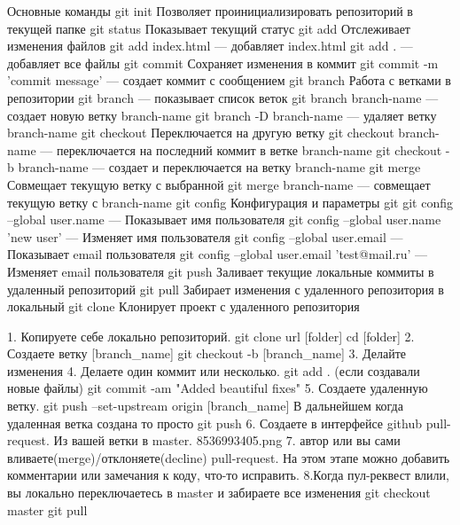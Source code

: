 
Основные команды
git init
Позволяет проинициализировать репозиторий в текущей папке
git status
Показывает текущий статус
git add
Отслеживает изменения файлов
git add index.html — добавляет index.html
git add . — добавляет все файлы
git commit
Сохраняет изменения в коммит
git commit -m 'commit message' — создает коммит с сообщением
git branch
Работа с ветками в репозитории
git branch — показывает список веток
git branch branch-name — создает новую ветку branch-name
git branch -D branch-name — удаляет ветку branch-name
git checkout
Переключается на другую ветку
git checkout branch-name — переключается на последний коммит в ветке
branch-name
git checkout -b branch-name — создает и переключается на ветку branch-name
git merge
Совмещает текущую ветку с выбранной
git merge branch-name — совмещает текущую ветку с branch-name
git config
Конфигурация и параметры git
git config --global user.name — Показывает имя пользователя
git config --global user.name 'new user' — Изменяет имя пользователя
git config --global user.email — Показывает email пользователя
git config --global user.email 'test@mail.ru' — Изменяет email пользователя
git push
Заливает текущие локальные коммиты в удаленный репозиторий
git pull
Забирает изменения с удаленного репозитория в локальный
git clone
Клонирует проект с удаленного репозитория







1. Копируете себе локально репозиторий.
git clone url [folder]
cd [folder]
2. Создаете ветку [branch_name]
git checkout -b [branch_name]
3. Делайте изменения
4. Делаете один коммит или несколько.
git add . (если создавали новые файлы)
git commit -am "Added beautiful fixes"
5. Создаете удаленную ветку.
git push --set-upstream origin [branch_name]
В дальнейшем когда удаленная ветка создана то просто
git push
6. Создаете в интерфейсе github pull-request. Из вашей ветки в master.
8536993405.png
7. автор или вы сами вливаете(merge)/отклоняете(decline) pull-request.
На этом этапе можно добавить комментарии или замечания к коду, что-то исправить.
8.Когда пул-реквест влили, вы локально переключаетесь в master и забираете все изменения
git checkout master
git pull
